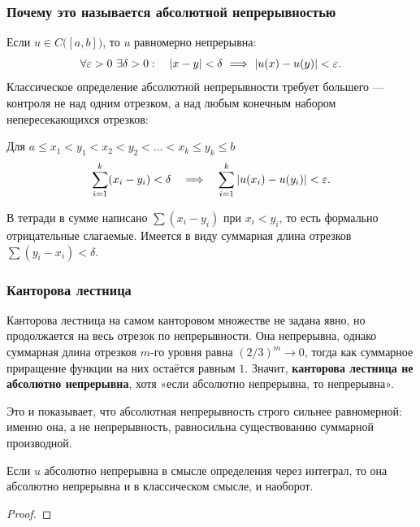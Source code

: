 \subsubsection*{Почему это называется абсолютной непрерывностью}

Если $u \in C\big([a,b]\big)$, то $u$ равномерно непрерывна:
\[
  \forall \varepsilon > 0 \ \exists \delta > 0: \quad |x - y| < \delta
  \ \Longrightarrow\ |u(x) - u(y)| < \varepsilon .
\]
Классическое определение абсолютной непрерывности требует большего — контроля не над
одним отрезком, а над любым конечным набором непересекающихся отрезков:
\begin{idea}[title={Классическое определение}]
Для $a \le x_1 < y_1 < x_2 < y_2 < \dots < x_k \le y_k \le b$
\[
  \sum_{i=1}^{k} (x_i - y_i) < \delta
  \quad\Longrightarrow\quad
  \sum_{i=1}^{k} |u(x_i) - u(y_i)| < \varepsilon .
\]
\end{idea}

\begin{warn}
В тетради в сумме написано $\sum (x_i - y_i)$ при $x_i < y_i$, то есть формально
отрицательные слагаемые. Имеется в виду суммарная длина отрезков
$\sum (y_i - x_i) < \delta$.
\end{warn}

\subsubsection*{Канторова лестница}


Канторова лестница на самом канторовом множестве не задана явно, но продолжается
на весь отрезок по непрерывности. Она непрерывна, однако суммарная длина отрезков
$m$-го уровня равна $(2/3)^m \to 0$, тогда как суммарное приращение функции на них
остаётся равным $1$. Значит, \textbf{канторова лестница не абсолютно непрерывна}, хотя
«если абсолютно непрерывна, то непрерывна».

\begin{idea}
Это и показывает, что абсолютная непрерывность строго сильнее равномерной: именно она,
а не непрерывность, равносильна существованию суммарной производной.
\end{idea}

\begin{proposition}
Если $u$ абсолютно непрерывна в смысле определения через интеграл, то она абсолютно
непрерывна и в классическом смысле, и наоборот.
\end{proposition}

\begin{proof}
\plusplus
\end{proof}
